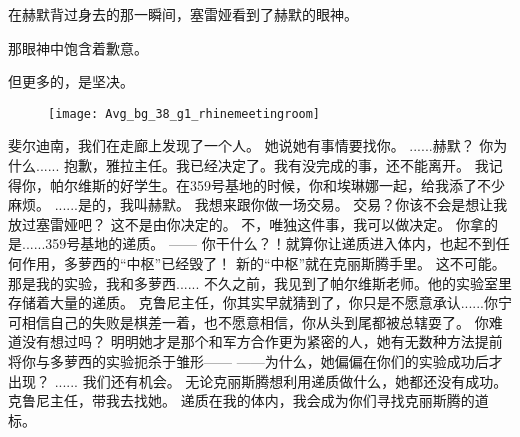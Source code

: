 \documentclass[openany]{book}
\begin{document}
在赫默背过身去的那一瞬间，塞雷娅看到了赫默的眼神。\par
那眼神中饱含着歉意。\par
但更多的，是坚决。

\begin{figure}[h]
    \centering
    \texttt{[image: Avg\_bg\_38\_g1\_rhinemeetingroom]}
\end{figure}
\begin{dialogue}
     斐尔迪南，我们在走廊上发现了一个人。
     她说她有事情要找你。
     ......赫默？
     你为什么......
     抱歉，雅拉主任。我已经决定了。我有没完成的事，还不能离开。
     我记得你，帕尔维斯的好学生。在359号基地的时候，你和埃琳娜一起，给我添了不少麻烦。
     ......是的，我叫赫默。
     我想来跟你做一场交易。
     交易？你该不会是想让我放过塞雷娅吧？
     这不是由你决定的。
     不，唯独这件事，我可以做决定。
     你拿的是......359号基地的递质。
     ——
     你干什么？！就算你让递质进入体内，也起不到任何作用，多萝西的“中枢”已经毁了！
     新的“中枢”就在克丽斯腾手里。
     这不可能。那是我的实验，我和多萝西......
     不久之前，我见到了帕尔维斯老师。他的实验室里存储着大量的递质。
     克鲁尼主任，你其实早就猜到了，你只是不愿意承认......你宁可相信自己的失败是棋差一着，也不愿意相信，你从头到尾都被总辖耍了。
     你难道没有想过吗？
     明明她才是那个和军方合作更为紧密的人，她有无数种方法提前将你与多萝西的实验扼杀于雏形——
     ——为什么，她偏偏在你们的实验成功后才出现？
     ......
     我们还有机会。
     无论克丽斯腾想利用递质做什么，她都还没有成功。
     克鲁尼主任，带我去找她。
     递质在我的体内，我会成为你们寻找克丽斯腾的道标。
\end{dialogue}
\end{document}

